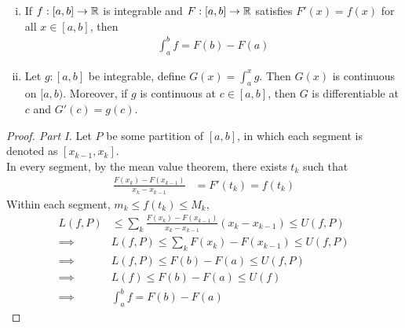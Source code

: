 \documentclass[11pt]{article}
\begin{document}
	\begin{theorem}
		\quad
		\begin{enumerate}[(i)]
			\item If $f: [a, b] \to \mathbb{R}$ is integrable and $F: [a, b] \to \mathbb{R}$ satisfies $F'(x) = f(x)$ for all $x \in [a, b]$, then
				\begin{align}
					\int_a^b f = F(b) - F(a)
				\end{align}
			\item Let $g: [a, b]$ be integrable, define $G(x) = \int_a^x g$. Then $G(x)$ is continuous on $[a, b)$. Moreover, if $g$ is continuous at $c \in [a, b]$, then $G$ is differentiable at $c$ and $G'(c) = g(c)$.
		\end{enumerate}
	\end{theorem}
	
	\begin{proof}[Proof. Part I]
		Let $P$ be some partition of $[a, b]$, in which each segment is denoted as $[x_{k-1}, x_k]$. \\
		In every segment, by the mean value theorem, there exists $t_k$ such that
		\begin{align}
			\frac{F(x_k) - F(x_{k-1})}{x_k - x_{k-1}} &= F'(t_k) = f(t_k)
		\end{align}
		Within each segment, $m_k \leq f(t_k) \leq M_k$,
		\begin{align}
			L(f, P) &\leq \sum_k \frac{F(x_k) - F(x_{k-1})}{x_k - x_{k-1}} (x_k - x_{k-1}) \leq U(f, P) \\
			\implies & L(f, P) \leq \sum_k F(x_k) - F(x_{k-1}) \leq U(f, P) \\
			\implies & L(f, P) \leq F(b) - F(a) \leq U(f, P) \\
			\implies & L(f) \leq F(b) - F(a) \leq U(f) \\
			\implies & \int_a^b f = F(b) - F(a)
		\end{align}
	\end{proof}
	
\end{document}
